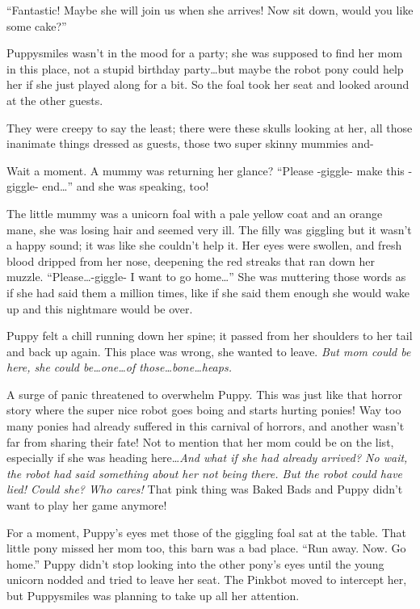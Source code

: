``Fantastic! Maybe she will join us when she arrives! Now sit down, would you like some cake?''

Puppysmiles wasn't in the mood for a party; she was supposed to find her mom in this place, not a stupid birthday party\dots but maybe the robot pony could help her if she just played along for a bit. So the foal took her seat and looked around at the other guests.

They were creepy to say the least; there were these skulls looking at her, all those inanimate things dressed as guests, those two super skinny mummies and-

Wait a moment. A mummy was returning her glance? ``Please -giggle- make this -giggle- end\dots'' and she was speaking, too!

The little mummy was a unicorn foal with a pale yellow coat and an orange mane, she was losing hair and seemed very ill. The filly was giggling but it wasn't a happy sound; it was like she couldn't help it. Her eyes were swollen, and fresh blood dripped from her nose, deepening the red streaks that ran down her muzzle. ``Please\dots -giggle- I want to go home\dots'' She was muttering those words as if she had said them a million times, like if she said them enough she would wake up and this nightmare would be over.

Puppy felt a chill running down her spine; it passed from her shoulders to her tail and back up again. This place was wrong, she wanted to leave. \emph{But mom could be here, she could be\dots one\dots of those\dots bone\dots heaps.}

A surge of panic threatened to overwhelm Puppy. This was just like that horror story where the super nice robot goes boing and starts hurting ponies! Way too many ponies had already suffered in this carnival of horrors, and another wasn't far from sharing their fate! Not to mention that her mom could be on the list, especially if she was heading here\dots \emph{And what if she had already arrived? No wait, the robot had said something about her not being there. But the robot could have lied! Could she? Who cares!} That pink thing was Baked Bads and Puppy didn't want to play her game anymore!

For a moment, Puppy's eyes met those of the giggling foal sat at the table. That little pony missed her mom too, this barn was a bad place. ``Run away. Now. Go home.'' Puppy didn't stop looking into the other pony's eyes until the young unicorn nodded and tried to leave her seat. The Pinkbot moved to intercept her, but Puppysmiles was planning to take up all her attention.

